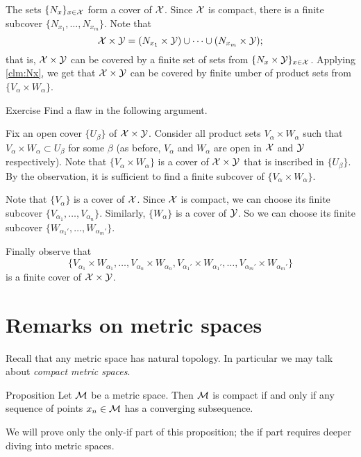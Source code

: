 The sets $\{N_x\}_{x\in\mathcal{X}}$ form a cover of $\mathcal{X}$.
Since $\mathcal{X}$ is compact, 
there is a finite subcover $\{N_{x_1},\dots,N_{x_m}\}$.
Note that 
\[\mathcal{X}\times\mathcal{Y}=(N_{x_1}\times \mathcal{Y})\cup\dots\cup (N_{x_m}\times \mathcal{Y});\]
that is, $\mathcal{X}\times\mathcal{Y}$ can be covered by a finite set of sets from $\{N_x\times \mathcal{Y}\}_{x\in\mathcal{X}}$.
Applying \ref{clm:Nx}, we get that $\mathcal{X}\times\mathcal{Y}$ can be covered by finite umber of product sets from $\{V_\alpha\times W_\alpha\}$.
\qeds

\begin{thm}{Exercise}
Find a flaw in the following argument.
\end{thm}

Fix an open cover $\{U_\beta\}$ of $\mathcal{X}\times\mathcal{Y}$.
Consider all product sets $V_\alpha\times W_\alpha$ such that $V_\alpha\times W_\alpha\subset U_\beta$ for some $\beta$ (as before, $V_\alpha$ and $W_\alpha$ are open in $\mathcal{X}$ and $\mathcal{Y}$ respectively).
Note that $\{V_\alpha\times W_\alpha\}$ is a cover of $\mathcal{X}\times\mathcal{Y}$ that is inscribed in $\{U_\beta\}$.
By the observation, it is sufficient to find a finite subcover of $\{V_\alpha\times W_\alpha\}$.

Note that $\{V_\alpha\}$ is a cover of $\mathcal{X}$.
Since $\mathcal{X}$ is compact, we can choose its finite subcover $\{V_{\alpha_1},\dots,V_{\alpha_n}\}$.
Similarly, $\{W_\alpha\}$ is a cover of $\mathcal{Y}$.
So we can choose its finite subcover $\{W_{\alpha_1'},\dots,W_{\alpha_m'}\}$.

Finally observe that 
\[\{V_{\alpha_1}\times W_{\alpha_1},\dots,V_{\alpha_n}\times W_{\alpha_n},V_{\alpha_1'}\times W_{\alpha_1'},\dots,V_{\alpha_m'}\times W_{\alpha_m'}\}\] is a finite cover of $\mathcal{X}\times\mathcal{Y}$.
\qeds


\section{Remarks on metric spaces}

Recall that any metric space has natural topology.
In particular we may talk about \emph{compact metric spaces}.

\begin{thm}{Proposition}
Let $\mathcal{M}$ be a metric space.
Then $\mathcal{M}$ is compact if and only if any sequence of points $x_n\in \mathcal{M}$ has a converging subsequence.
\end{thm}

We will prove only the only-if part of this proposition;
the if part requires deeper diving into metric spaces.

